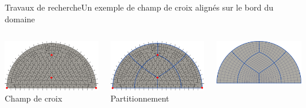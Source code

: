 \documentclass[compress,10pt,aspectratio=169]{beamer}
\begin{document}
\begin{frame}{Travaux de recherche}{Un exemple de champ de croix alignés sur le bord du domaine}

    \begin{columns}
        \begin{column}{0.33\textwidth}
        \centering
        \includegraphics[scale=0.087]{images/demi_disc_align_first.pdf} \hspace{0.2cm}
        \footnotesize Champ de croix
        \end{column}
        \begin{column}{0.33\textwidth}
        \centering
        \includegraphics[scale=0.087]{images/demi_disc_align_second.pdf} \hspace{0.2cm}
        \footnotesize Partitionnement
        \end{column}
        \begin{column}{0.33\textwidth}
        \centering
        \includegraphics[scale=0.087]{images/demi_disc_align_third.pdf} \hspace{0.2cm}

\end{column}
\end{columns}
\end{frame}
\end{document}
